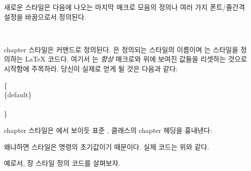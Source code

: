
새로운 스타일은 다음에 나오는 마지막 매크로 모음의 정의나
여러 가지 폰트/줄간격 설정을 바꿈으로서 정의된다.


\begin{syntax}
\cmd{\makechapterstyle} \\
\end{syntax}

chapter 스타일은 \cmd{\makechapterstyle} 커맨드로 정의된다.
은 정의되는 스타일의 이름이며 는 스타일을 정의하는
LaTeX 코드다.
여기서 는 \emph{항상} 매크로와 위에 보여진 값들을 리셋하는 것으로
시작함에 주목하라.
당신이 실제로 얻게 될 것은 다음과 같다:
\begin{syntax}
\cmd{\makechapterstyle}\{\\
  \cmd{\chapterstyle}\{default\}\\
  \\
\}
\end{syntax}



 chapter 스타일은  에서 보이듯
표준 ,  클래스의 chapter 헤딩을 흉내낸다:
\begin{lcode}
\end{lcode}
왜냐하면  스타일은 \cmd{\makechapterstyle} 명령의
초기값이기 때문이다. 실제 코드는 위와 같다.



예로서,  장 스타일 정의 코드를 살펴보자.
\begin{lcode}
\end{lcode}


